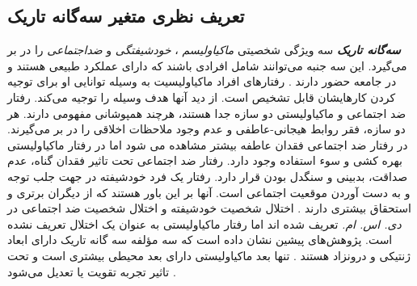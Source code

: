 \subsection{تعریف نظری متغیر سه‌گانه تاریک}
\textit{
    \textbf{
        سه‌گانه تاریک
    }
}
سه ویژگی شخصیتی
\textit{
    ماکیاولیسم
}
\!،
\textit{
    خودشیفتگی
}
و
\textit{
    ضداجتماعی
}
را در بر می‌گیرد. این سه جنبه می‌توانند شامل افرادی باشند که دارای عملکرد طبیعی هستند و در جامعه حضور دارند
\!\citep{paulhusDarkTriadPersonality2002}
\!.
رفتارهای افراد ماکیاولیسیت به وسیله توانایی او برای توجیه کردن
کارهایشان قابل تشخیص است. از دید آنها هدف وسیله را توجیه
می‌کند. رفتار ضد اجتماعی و ماکیاولیستی دو سازه جدا هستند، هرچند همپوشانی
مفهومی دارند. هر دو سازه، فقر روابط هیجانی-عاطفی و عدم وجود
ملاحظات اخلاقی را در بر می‌گیرند. در رفتار ضد اجتماعی فقدان عاطفه
بیشتر مشاهده می شود
\!\citep{paulhusDarkTriadPersonality2002,vernonBehavioralGeneticInvestigation2008}
اما در رفتار ماکیاولیستی بهره کشی و سوء استفاده وجود دارد.
رفتار ضد اجتماعی تحت تاثیر فقدان گناه، عدم صداقت، بدبینی و
سنگدل بودن قرار دارد.
رفتار یک فرد خودشیفته  در جهت جلب توجه و به دست آوردن موقعیت
اجتماعی است. آنها بر این باور هستند که از دیگران برتری و استحقاق بیشتری دارند
\!. اختلال شخصیت خودشیفته و اختلال شخصیت ضد اجتماعی در
\textit{
    دی. اس. ام.
}
\!\!
تعریف شده اند اما رفتار ماکیاولیستی به
عنوان یک اختلال تعریف نشده است. پژوهش‌های پیشین نشان داده است که سه
مؤلفه سه گانه تاریک دارای ابعاد ژنتیکی و درونزاد هستند
\!\citep{kvTraitEmotionalIntelligence2011}
\!.
تنها بعد ماکیاولیستی دارای بعد محیطی بیشتری است و تحت تاثیر تجربه تقویت یا تعدیل می‌شود
\!.

